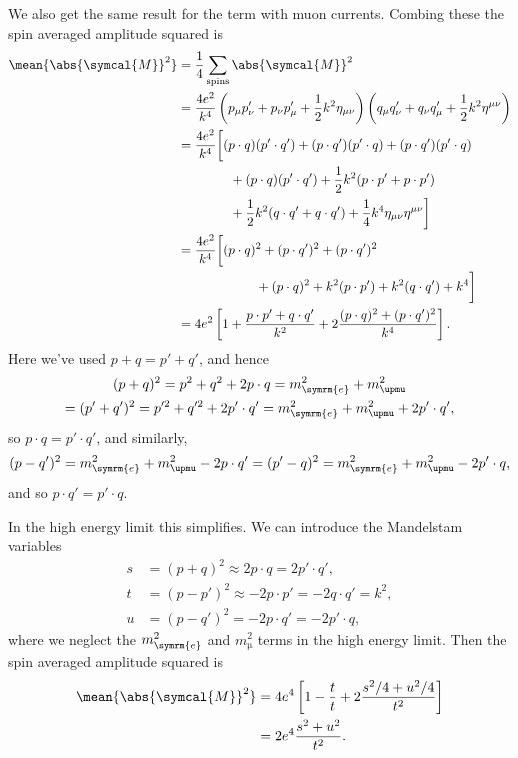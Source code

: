 \documentclass[fleqn]{NotesClass}
\newcommand{\minkowskiMetric}{\eta}
\newcommand{\amplitude}{\symcal{M}}
\begin{document}
    We also get the same result for the term with muon currents.
    Combing these the spin averaged amplitude squared is
    \begin{align}
        \mean{\abs{\amplitude}^2} &= \frac{1}{4} \sum_{\text{spins}} \abs{\amplitude}^2\\
        &= \frac{4e^2}{k^4}\left( p_\mu p'_\nu + p_\nu p'_\mu + \frac{1}{2}k^2 \minkowskiMetric_{\mu\nu} \right) \left( q_\mu q'_\nu + q_\nu q'_\mu + \frac{1}{2} k^2 \minkowskiMetric^{\mu\nu} \right)\\
        &= \frac{4e^2}{k^4} \biggl[ (p \cdot q) (p' \cdot q') + (p \cdot q')(p' \cdot q) + (p \cdot q')(p' \cdot q)\\
        &\qquad\qquad+ (p \cdot q)(p' \cdot q') + \frac{1}{2}k^2(p \cdot p' + p \cdot p') \notag\\
        &\qquad\qquad+ \frac{1}{2}k^2(q \cdot q' + q \cdot q') + \frac{1}{4}k^4 \minkowskiMetric_{\mu\nu} \minkowskiMetric^{\mu\nu} \biggr]\notag\\
        &= \frac{4e^2}{k^4} \biggl[ (p \cdot q)^2 + (p \cdot q')^2 + (p \cdot q')^2\\
        &\qquad\qquad\qquad + (p \cdot q)^2 + k^2(p \cdot p') + k^2(q \cdot q') + k^4 \biggr]\notag\\
        &= 4e^2 \left[ 1 + \frac{p \cdot p' + q \cdot q'}{k^2} + 2 \frac{(p \cdot q)^2 + (p \cdot q')^2}{k^4} \right].
    \end{align}
    Here we've used \(p + q = p' + q'\), and hence
    \begin{multline}
        (p + q)^2 = p^2 + q^2 + 2p\cdot q = m_{\symrm{e}}^2 + m_{\upmu}^2\\
        = (p' + q')^2 = p'^2 + q'^2 + 2p' \cdot q' = m_{\symrm{e}}^2 + m_{\upmu}^2 + 2p' \cdot q',
    \end{multline}
    so \(p \cdot q = p' \cdot q'\), and similarly,
    \begin{equation}
        (p - q')^2 = m_{\symrm{e}}^2 + m_{\upmu}^2 - 2p \cdot q' = (p' - q)^2 = m_{\symrm{e}}^2 + m_{\upmu}^2 - 2p' \cdot q,
    \end{equation}
    and so \(p \cdot q' = p' \cdot q\).
    
    In the high energy limit this simplifies.
    We can introduce the Mandelstam variables
    \begin{align}
        s &= (p + q)^2 \approx 2p \cdot q = 2p' \cdot q',\\
        t &= (p - p')^2 \approx -2p \cdot p' = -2q \cdot q' = k^2,\\
        u &= (p - q')^2 = -2p\cdot q' = -2p' \cdot q,
    \end{align}
    where we neglect the \(m_{\symrm{e}}^2\) and \(m_{\upmu}^2\) terms in the high energy limit.
    Then the spin averaged amplitude squared is
    \begin{align}
        \mean{\abs{\amplitude}^2} &= 4e^4\left[ 1 - \frac{t}{t} + 2\frac{s^2/4 + u^2/4}{t^2} \right]\\
        &= 2e^4\frac{s^2 + u^2}{t^2}.
    \end{align}
    
\end{document}
